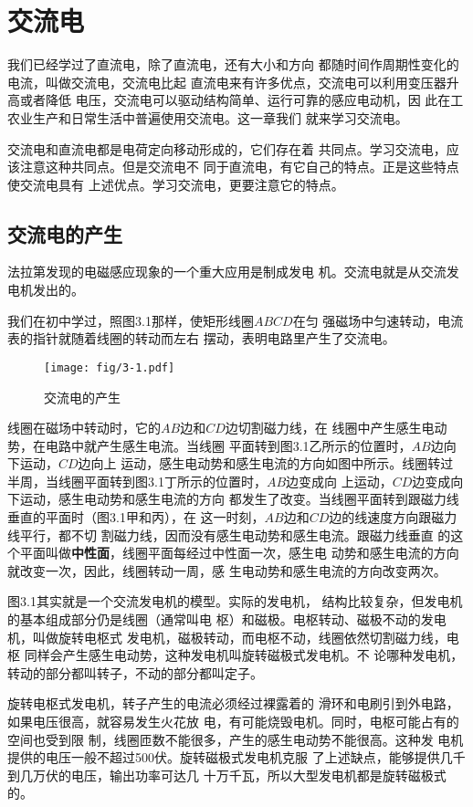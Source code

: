 \chapter{交流电}
我们已经学过了直流电，除了直流电，还有大小和方向
都随时间作周期性变化的电流，叫做交流电，交流电比起
直流电来有许多优点，交流电可以利用变压器升高或者降低
电压，交流电可以驱动结构简单、运行可靠的感应电动机，因
此在工农业生产和日常生活中普遍使用交流电。这一章我们
就来学习交流电。

交流电和直流电都是电荷定向移动形成的，它们存在着
共同点。学习交流电，应该注意这种共同点。但是交流电不
同于直流电，有它自己的特点。正是这些特点使交流电具有
上述优点。学习交流电，更要注意它的特点。

\section{交流电的产生}


法拉第发现的电磁感应现象的一个重大应用是制成发电
机。交流电就是从交流发电机发出的。

我们在初中学过，照图3.1那样，使矩形线圈$ABCD$在匀
强磁场中匀速转动，电流表的指针就随着线圈的转动而左右
摆动，表明电路里产生了交流电。

\begin{figure}[htp]\centering
    \texttt{[image: fig/3-1.pdf]}
    \caption{交流电的产生}
    \end{figure}

线圈在磁场中转动时，它的$AB$边和$CD$边切割磁力线，在
线圈中产生感生电动势，在电路中就产生感生电流。当线圈
平面转到图3.1乙所示的位置时，$AB$边向下运动，$CD$边向上
运动，感生电动势和感生电流的方向如图中所示。线圈转过
半周，当线圈平面转到图3.1丁所示的位置时，$AB$边变成向
上运动，$CD$边变成向下运动，感生电动势和感生电流的方向
都发生了改变。当线圈平面转到跟磁力线垂直的平面时（图3.1甲和丙），在
这一时刻，$AB$边和$CD$边的线速度方向跟磁力线平行，都不切
割磁力线，因而没有感生电动势和感生电流。跟磁力线垂直
的这个平面叫做\textbf{中性面}，线圈平面每经过中性面一次，感生电
动势和感生电流的方向就改变一次，因此，线圈转动一周，感
生电动势和感生电流的方向改变两次。

图3.1其实就是一个交流发电机的模型。实际的发电机，
结构比较复杂，但发电机的基本组成部分仍是线圈（通常叫电
枢）和磁极。电枢转动、磁极不动的发电机，叫做旋转电枢式
发电机，磁极转动，而电枢不动，线圈依然切割磁力线，电枢
同样会产生感生电动势，这种发电机叫旋转磁极式发电机。不
论哪种发电机，转动的部分都叫转子，不动的部分都叫定子。

旋转电枢式发电机，转子产生的电流必须经过裸露着的
滑环和电刷引到外电路，如果电压很高，就容易发生火花放
电，有可能烧毁电机。同时，电枢可能占有的空间也受到限
制，线圈匝数不能很多，产生的感生电动势不能很高。这种发
电机提供的电压一般不超过500伏。旋转磁极式发电机克服
了上述缺点，能够提供几千到几万伏的电压，输出功率可达几
十万千瓦，所以大型发电机都是旋转磁极式的。

